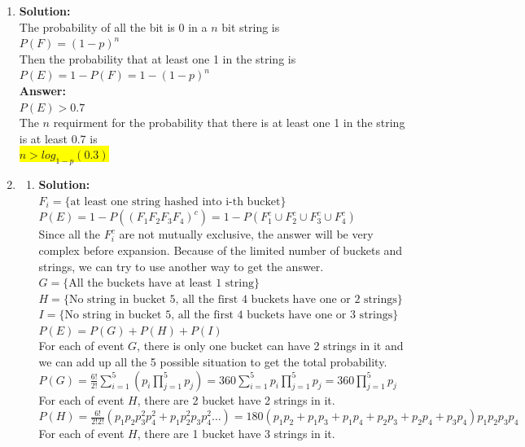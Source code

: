 \documentclass{article}
\newcommand{\myansw}{\textbf{Answer:}\\}
\newcommand{\mysolu}{\textbf{Solution:}\\}
\begin{document}
\begin{enumerate}
\begin{enumerate}
	\end{enumerate}
	\item
	\mysolu
	The probability of all the bit is 0 in a ${n}$ bit string is\\
	${P(F) = (1-p)^n}$\\
	Then the probability that at least one 1 in the string is\\
	${P(E) = 1- P(F)= 1-(1-p)^n}$\\
	\myansw
	${P(E)>0.7}$\\
	The ${n}$ requirment for the probability that there is at least one 1 in the string is at least 0.7 is\\
	\colorbox{yellow}{	
		${n>log_{1-p}(0.3)}$
	}\\
	\item
	\begin{enumerate}
		\item
		\mysolu
		${F_i=\{\text{at least one string hashed into i-th bucket}\}}$\\
		${P(E) = 1-P((F_1 F_2 F_3 F_4)^c)=1-P(F_1^c \cup F_2^c \cup F_3^c \cup F_4^c)}$\\
		Since all the ${F_i^c}$ are not mutually exclusive, the answer will be very complex before expansion.
		Because of the limited number of buckets and strings, we can try to use another way to get the answer.\\
		${G = \{\text{All the buckets have at least 1 string}\}}$\\
		${H = \{\text{No string in bucket 5, all the first 4 buckets have  one or 2 strings}\}}$\\
		${I = \{\text{No string in bucket 5, all the first 4 buckets have  one or 3 strings}\}}$\\
		${P(E)=P(G)+P(H)+P(I)}$\\
		For each of event ${G}$, there is only one bucket can have 2 strings in it and we can add up all the 5 possible situation to get the total probability.\\
		${P(G)=\frac{6!}{2!}\sum\limits_{i=1}^5(p_i\prod\limits_{j=1}^5p_j)=360\sum\limits_{i=1}^5 p_i\prod\limits_{j=1}^5p_j = 360\prod\limits_{j=1}^5p_j}$\\
		For each of event ${H}$, there are 2 bucket have 2 strings in it.\\
		${P(H)=\frac{6!}{2!2!}(p_1 p_2 p_3^2 p_4^2+p_1 p_2^2 p_3 p_4^2 \ldots)=180(p_1 p_2 + p_1 p_3 + p_1 p_4 + p_2 p_3 + p_2 p_4 + p_3 p_4)p_1 p_2 p_3 p_4}$\\
		For each of event ${H}$, there are 1 bucket have 3 strings in it.\\

\end{enumerate}
\end{enumerate}
\end{document}
